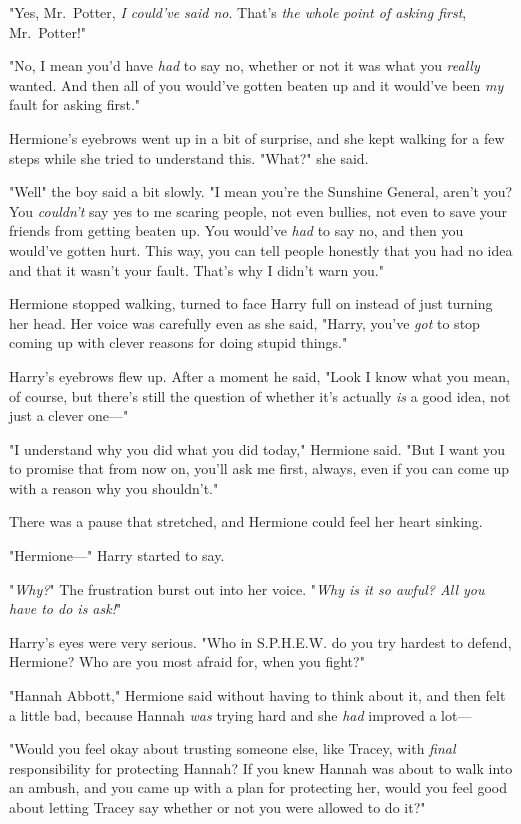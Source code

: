 "Yes, Mr.~Potter, \emph{I could've said no}. That's \emph{the whole point of
asking first}, Mr.~Potter!"

"No, I mean you'd have \emph{had} to say no, whether or not it was what you
\emph{really} wanted. And then all of you would've gotten beaten up and it
would've been \emph{my} fault for asking first."

Hermione's eyebrows went up in a bit of surprise, and she kept walking for a
few steps while she tried to understand this. "What?" she said.

"Well{\el}" the boy said a bit slowly. "I mean{\el} you're the Sunshine
General, aren't you? You \emph{couldn't} say yes to me scaring people, not even
bullies, not even to save your friends from getting beaten up. You would've
\emph{had} to say no, and then you would've gotten hurt. This way, you can tell
people honestly that you had no idea and that it wasn't your fault. That's why
I didn't warn you."

Hermione stopped walking, turned to face Harry full on instead of just turning
her head. Her voice was carefully even as she said, "Harry, you've \emph{got}
to stop coming up with clever reasons for doing stupid things."

Harry's eyebrows flew up. After a moment he said, "Look{\el} I know what you
mean, of course, but there's still the question of whether it's actually
\emph{is} a good idea, not just a clever one\mbox{---}"

"I understand why you did what you did today," Hermione said. "But I want you
to promise that from now on, you'll ask me first, always, even if you can come
up with a reason why you shouldn't."

There was a pause that stretched, and Hermione could feel her heart sinking.

"Hermione\mbox{---}" Harry started to say.

"\emph{Why?}" The frustration burst out into her voice. "\emph{Why is it so
awful? All you have to do is ask!}"

Harry's eyes were very serious. "Who in S.P.H.E.W. do you try hardest to
defend, Hermione? Who are you most afraid for, when you fight?"

"Hannah Abbott," Hermione said without having to think about it, and then felt
a little bad, because Hannah \emph{was} trying hard and she \emph{had} improved
a lot---

"Would you feel okay about trusting someone else, like Tracey, with
\emph{final} responsibility for protecting Hannah? If you knew Hannah was about
to walk into an ambush, and you came up with a plan for protecting her, would
you feel good about letting Tracey say whether or not you were allowed to do
it?"

